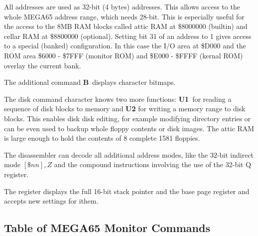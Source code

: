 \begin{description}[leftmargin=1cm,style=nextline]
\item[Adddresses:] All addresses are used as 32-bit (4 bytes) addresses.
   This allows access to the whole MEGA65 address range, which needs
   28-bit. This is especially useful for the access to the 8MB RAM blocks
   called attic RAM at \$8000000 (builtin) and cellar RAM at
   \$8800000 (optional). Setting bit 31 of an address to 1 gives access
   to a special (banked) configuration. In this case the I/O area at \$D000
   and the ROM area \$6000 - \$7FFF (monitor ROM) and \$E000 - \$FFFF
   (kernal ROM) overlay the current bank.

\item[Commands:] The additional command {\bf B} displays character bitmaps.

\item[Disk access:] The disk command character {\bf \@} knows two more
  functions: {\bf U1} for reading a sequence of disk blocks to memory and
  {\bf U2} for writing a memory range to disk blocks. This enables disk
  disk editing, for example modifying directory entries or can be even
  used to backup whole floppy contents or disk images. The attic RAM is
  large enough to hold the contents of 8 complete 1581 floppies.

\item[Disassembler:] The disassembler can decode all additional
  address modes, like the 32-bit indirect mode $[\$nn],Z$
  and the compound instructions involving the use of the 32-bit Q register.

\item[Register:] The register displays the full 16-bit stack pointer
 and the base page register and accepts new settings for ithem.

\end{description}

\subsection{Table of MEGA65 Monitor Commands}

